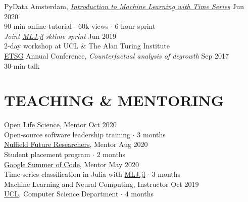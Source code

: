 \documentclass{cv}
\newcommand{\printbibsection}[2]{
\begin{refsection}
\nocite{*}
\printbibliography[sorting=chronological,
                  type={#1},
                  title={#2},
                  heading=none]
\end{refsection}
}
\begin{document}
PyData Amsterdam, \href{https://www.youtube.com/watch?v=wqQKFu41FIw}{\textit{Introduction to Machine Learning with Time Series}} \hfill Jun 2020 \\
{\color{lightgray} 90-min online tutorial $\cdot$ 60k views $\cdot$ 6-hour sprint} \\

\textit{Joint \href{https://github.com/alan-turing-institute/MLJ.jl}{MLJ.jl} sktime sprint} \hfill Jun 2019 \\
{\color{lightgray} 2-day workshop at UCL \& The Alan Turing Institute} \\

\href{https://www.etsg.org}{ETSG} Annual Conference, \textit{Counterfactual analysis of degrowth} \hfill Sep 2017 \\
{\color{lightgray} 30-min talk} \\


\section{TEACHING \& MENTORING}

\href{https://openlifesci.org}{Open Life Science}, Mentor \hfill Oct 2020 \\
{\color{lightgray} Open-source software leadership training $\cdot$ 3 months}\\

\href{https://www.nuffieldfoundation.org/students-teachers/nuffield-future-researchers}{Nuffield Future Researchers}, Mentor \hfill Aug 2020 \\
{\color{lightgray} Student placement program $\cdot$ 2 months}\\

\href{https://summerofcode.withgoogle.com/archive/2020/projects/6262209727954944/}{Google Summer of Code}, Mentor \hfill May 2020 \\
{\color{lightgray} Time series classification in Julia with  \href{https://github.com/alan-turing-institute/MLJ.jl}{MLJ.jl} $\cdot$ 3 months}\\

Machine Learning and Neural Computing, Instructor \hfill Oct 2019 \\
{\color{lightgray} \href{https://www.ucl.ac.uk/}{UCL}, Computer Science Department $\cdot$ 4 months} \\
\end{document}
